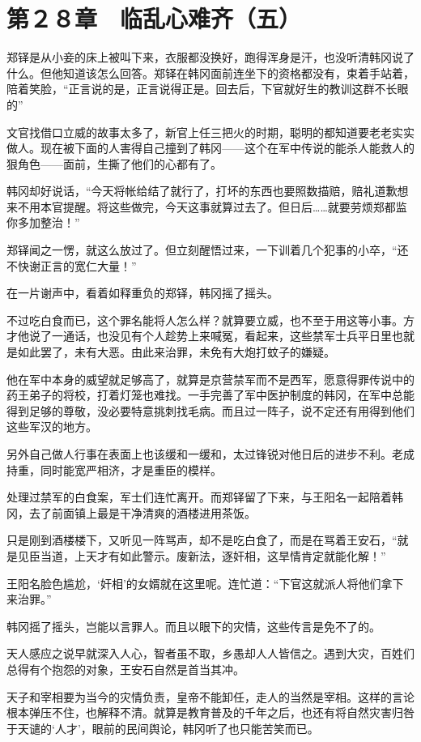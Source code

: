 \section{第２８章　临乱心难齐（五）}

郑铎是从小妾的床上被叫下来，衣服都没换好，跑得浑身是汗，也没听清韩冈说了什么。但他知道该怎么回答。郑铎在韩冈面前连坐下的资格都没有，束着手站着，陪着笑脸，“正言说的是，正言说得正是。回去后，下官就好生的教训这群不长眼的”

文官找借口立威的故事太多了，新官上任三把火的时期，聪明的都知道要老老实实做人。现在被下面的人害得自己撞到了韩冈——这个在军中传说的能杀人能救人的狠角色——面前，生撕了他们的心都有了。

韩冈却好说话，“今天将帐给结了就行了，打坏的东西也要照数描赔，赔礼道歉想来不用本官提醒。将这些做完，今天这事就算过去了。但日后……就要劳烦郑都监你多加整治！”

郑铎闻之一愣，就这么放过了。但立刻醒悟过来，一下训着几个犯事的小卒，“还不快谢正言的宽仁大量！”

在一片谢声中，看着如释重负的郑铎，韩冈摇了摇头。

不过吃白食而已，这个罪名能将人怎么样？就算要立威，也不至于用这等小事。方才他说了一通话，也没见有个人趁势上来喊冤，看起来，这些禁军士兵平日里也就是如此罢了，未有大恶。由此来治罪，未免有大炮打蚊子的嫌疑。

他在军中本身的威望就足够高了，就算是京营禁军而不是西军，愿意得罪传说中的药王弟子的将校，打着灯笼也难找。一手完善了军中医护制度的韩冈，在军中总能得到足够的尊敬，没必要特意挑刺找毛病。而且过一阵子，说不定还有用得到他们这些军汉的地方。

另外自己做人行事在表面上也该缓和一缓和，太过锋锐对他日后的进步不利。老成持重，同时能宽严相济，才是重臣的模样。

处理过禁军的白食案，军士们连忙离开。而郑铎留了下来，与王阳名一起陪着韩冈，去了前面镇上最是干净清爽的酒楼进用茶饭。

只是刚到酒楼楼下，又听见一阵骂声，却不是吃白食了，而是在骂着王安石，“就是见臣当道，上天才有如此警示。废新法，逐奸相，这旱情肯定就能化解！”

王阳名脸色尴尬，‘奸相’的女婿就在这里呢。连忙道：“下官这就派人将他们拿下来治罪。”

韩冈摇了摇头，岂能以言罪人。而且以眼下的灾情，这些传言是免不了的。

天人感应之说早就深入人心，智者虽不取，乡愚却人人皆信之。遇到大灾，百姓们总得有个抱怨的对象，王安石自然是首当其冲。

天子和宰相要为当今的灾情负责，皇帝不能卸任，走人的当然是宰相。这样的言论根本弹压不住，也解释不清。就算是教育普及的千年之后，也还有将自然灾害归咎于天谴的‘人才’，眼前的民间舆论，韩冈听了也只能苦笑而已。

